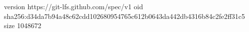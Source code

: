 version https://git-lfs.github.com/spec/v1
oid sha256:d34da7b94a48c62cdd102680954765c612b0643da442db4316b84c2fe2ff31c5
size 1048672
